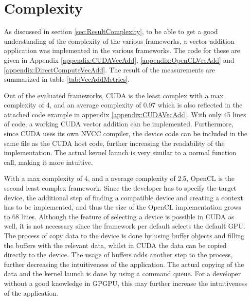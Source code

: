 \section{Complexity}

As discussed in section \ref{sec:ResultComplexity}, to be able to get a good understanding of the complexity of the various frameworks, a vector addition application was implemented in the various frameworks. The code for these are given in Appendix \ref{appendix:CUDAVecAdd}, \ref{appendix:OpenCLVecAdd} and \ref{appendix:DirectComputeVecAdd}. The result of the measurements are summarized in table \ref{tab:VecAddMetrics}.

Out of the evaluated frameworks, CUDA is the least complex with a max complexity of 4, and an average complexity of 0.97 which is also reflected in the attached code example in appendix \ref{appendix:CUDAVecAdd}. With only 45 lines of code, a working CUDA vector addition can be implemented. Furthermore, since CUDA uses its own NVCC compiler, the device code can be included in the same file as the CUDA host code, further increasing the readability of the implementation. The actual kernel launch is very similar to a normal function call, making it more intuitive.

With a max complexity of 4, and a average complexity of 2.5, OpenCL is the second least complex framework. Since the developer has to specify the target device, the additional step of finding a compatible device and creating a context has to be implemented, and thus the size of the OpenCL implementation grows to 68 lines. Although the feature of selecting a device is possible in CUDA as well, it is not necessary since the framework per default selects the default GPU. The process of copy data to the device is done by using buffer objects and filling the buffers with the relevant data, whilst in CUDA the data can be copied directly to the device. The usage of buffers adds another step to the process, further decreasing the intuitiveness of the application. The actual copying of the data and the kernel launch is done by using a command queue. For a developer without a good knowledge in GPGPU, this may further increase the intuitiveness of the application. 

